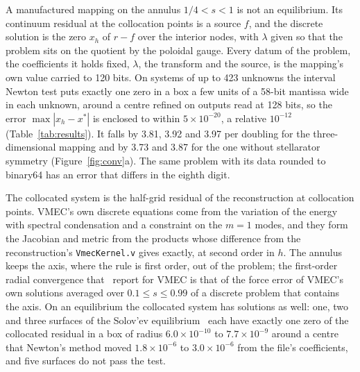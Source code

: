 \documentclass[11pt]{article}
\newcommand{\code}[1]{\texttt{#1}}
\begin{document}
A manufactured mapping on the annulus $1/4<s<1$ is not an equilibrium. Its
continuum residual at the collocation points is a source $f$, and the discrete
solution is the zero $x_h$ of $r-f$ over the interior nodes, with $\lambda$
given so that the problem sits on the quotient by the poloidal gauge. Every
datum of the problem, the coefficients it holds fixed, $\lambda$, the transform
and the source, is the mapping's own value carried to 120 bits. On systems of up
to 423 unknowns
the interval Newton test puts exactly one zero in a box a few units of a 58-bit
mantissa wide in each unknown, around a centre refined on outputs read at 128
bits, so the error $\max|x_h-x^*|$ is enclosed to within $5\times10^{-20}$, a
relative $10^{-12}$ (Table~\ref{tab:results}). It falls by 3.81, 3.92 and 3.97
per doubling for the three-dimensional mapping and by 3.73 and 3.87 for the one
without stellarator symmetry (Figure~\ref{fig:conv}a). The same problem with
its data rounded to binary64 has an error that differs in the eighth digit.

The collocated system is the half-grid residual of the reconstruction at
collocation points. VMEC's own discrete equations come from the variation of
the energy with spectral condensation and a constraint on the $m=1$ modes, and
they form the Jacobian and metric from the products whose difference from the
reconstruction's \code{VmecKernel.v} gives exactly, at second order in $h$. The
annulus keeps the axis, where the rule is first order, out of the problem; the
first-order radial convergence that~\cite{panici2023} report for VMEC is that of
the force error of VMEC's own solutions averaged over $0.1\le s\le0.99$ of a
discrete problem that contains the axis. On an equilibrium the collocated
system has solutions as well: one, two and three surfaces of the Solov'ev
equilibrium~\cite{soloviev1968} each have exactly one zero of the collocated
residual in a box of radius $6.0\times10^{-10}$ to $7.7\times10^{-9}$ around a
centre that Newton's method moved $1.8\times10^{-6}$ to $3.0\times10^{-6}$ from
the file's coefficients, and five surfaces do not pass the test.
\end{document}
